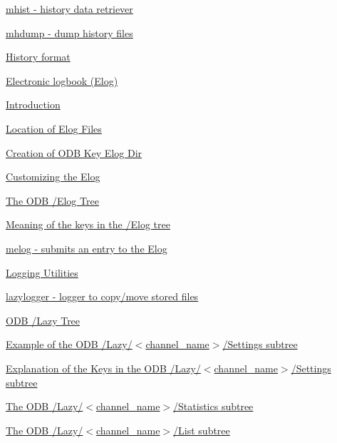 \begin{TabularC}{2}
\begin{TabularC}{2}
\begin{DoxyItemize}
\begin{DoxyItemize}
\begin{DoxyItemize}
\item \hyperlink{F_History_logging_F_mhist_utility}{mhist -\/ history data retriever} 
\item \hyperlink{F_History_logging_F_mhdump_utility}{mhdump -\/ dump history files} 
\item \hyperlink{F_History_logging_F_History_format}{History format} 
\end{DoxyItemize}
\item \hyperlink{F_Elog}{Electronic logbook (Elog)} 
\begin{DoxyItemize}
\item \hyperlink{F_Elog_F_Elog_Intro}{Introduction} 
\item \hyperlink{F_Elog_F_Logger_Elog_Files_Location}{Location of Elog Files} 
\begin{DoxyItemize}
\item \hyperlink{F_Elog_F_Logger_Create_Elog_Dir}{Creation of ODB Key Elog Dir} 
\end{DoxyItemize}
\item \hyperlink{F_Elog_F_Elog_Custom}{Customizing the Elog} 
\begin{DoxyItemize}
\item \hyperlink{F_Elog_F_ODB_Elog_Tree}{The ODB /Elog Tree} 
\item \hyperlink{F_Elog_F_ODB_Elog_Tree_Keys}{Meaning of the keys in the /Elog tree} 
\end{DoxyItemize}
\item \hyperlink{F_Elog_F_melog_utility}{melog -\/ submits an entry to the Elog} 
\end{DoxyItemize}
\item \hyperlink{F_LogUtil}{Logging Utilities} 
\begin{DoxyItemize}
\item \hyperlink{F_LogUtil_F_lazylogger_utility}{lazylogger -\/ logger to copy/move stored files} 
\item \hyperlink{F_LogUtil_F_ODB_Lazy_Tree}{ODB /Lazy Tree} 
\begin{DoxyItemize}
\item \hyperlink{F_LogUtil_F_ODB_Lazy_Settings_example}{Example of the ODB /Lazy/$<$channel\_\-name$>$/Settings subtree} 
\item \hyperlink{F_LogUtil_F_ODB_Lazy_Settings}{Explanation of the Keys in the ODB /Lazy/$<$channel\_\-name$>$/Settings subtree} 
\item \hyperlink{F_LogUtil_F_ODB_Lazy_Statistics}{The ODB /Lazy/$<$channel\_\-name$>$/Statistics subtree} 
\item \hyperlink{F_LogUtil_F_ODB_Lazy_List}{The ODB /Lazy/$<$channel\_\-name$>$/List subtree} 

\end{DoxyItemize}
\end{DoxyItemize}
\end{DoxyItemize}
\end{DoxyItemize}
\end{TabularC}
\end{TabularC}
